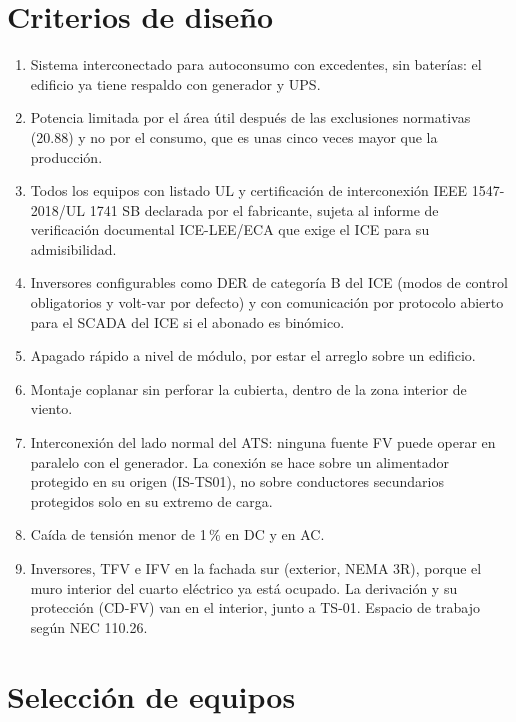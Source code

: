 \documentclass[12pt]{article}
\begin{document}
\section{Criterios de diseño}
\begin{enumerate}[leftmargin=1.2cm]
\item Sistema interconectado para autoconsumo con excedentes, sin baterías: el edificio ya tiene respaldo con generador y UPS.
\item Potencia limitada por el área útil después de las exclusiones normativas (\SI{20.88}{\kWp}) y no por el consumo, que es unas cinco veces mayor que la producción.
\item Todos los equipos con listado UL y certificación de interconexión IEEE 1547-2018/UL 1741 SB declarada por el fabricante, sujeta al informe de verificación documental ICE-LEE/ECA que exige el ICE para su admisibilidad.
\item Inversores configurables como DER de categoría B del ICE (modos de control obligatorios y volt-var por defecto) y con comunicación por protocolo abierto para el SCADA del ICE si el abonado es binómico.
\item Apagado rápido a nivel de módulo, por estar el arreglo sobre un edificio.
\item Montaje coplanar sin perforar la cubierta, dentro de la zona interior de viento.
\item Interconexión del lado normal del ATS: ninguna fuente FV puede operar en paralelo con el generador. La conexión se hace sobre un alimentador protegido en su origen (IS-TS01), no sobre conductores secundarios protegidos solo en su extremo de carga.
\item Caída de tensión menor de 1\,\% en DC y en AC.
\item Inversores, TFV e IFV en la fachada sur (exterior, NEMA 3R), porque el muro interior del cuarto eléctrico ya está ocupado. La derivación y su protección (CD-FV) van en el interior, junto a TS-01. Espacio de trabajo según NEC 110.26.
\end{enumerate}

\section{Selección de equipos}
\label{sec:equipos}
\end{document}
